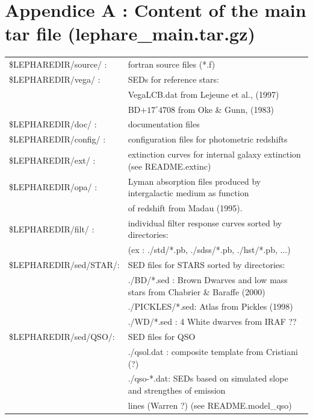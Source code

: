 \documentclass[12pt]{article}
\begin{document}
\section{Appendice A : Content of the main tar file (lephare\_main.tar.gz)}
%
\normalsize
\begin{tabular}{ll}
\$LEPHAREDIR/source/ :&  fortran source files (*.f) \\
%
\$LEPHAREDIR/vega/   :& SEDs for reference stars: \\
                    & VegaLCB.dat  from Lejeune et al., (1997) \\
                    & BD$+17^{\circ}4708$ from Oke \& Gunn, (1983) \\
%
\$LEPHAREDIR/doc/    :& documentation files \\
%
\$LEPHAREDIR/config/ :& configuration files for photometric redshifts  \\
%
\$LEPHAREDIR/ext/    :& extinction curves for internal galaxy extinction (see README.extinc)\\
%
\$LEPHAREDIR/opa/    :& Lyman absorption files produced by intergalactic medium as function \\
                    & of redshift from Madau (1995).  \\
%
\$LEPHAREDIR/filt/   :& individual filter response curves sorted by directories:  \\
		    &	       (ex : ./std/*.pb, ./sdss/*.pb, ./hst/*.pb, ...) \\
%
\$LEPHAREDIR/sed/STAR/:& SED files for STARS  sorted by directories: \\
		&	       ./BD/*.sed     : Brown Dwarves and low mass stars from Chabrier \& Baraffe (2000) \\
		&	       ./PICKLES/*.sed: Atlas from Pickles (1998) \\
		&	       ./WD/*.sed     : 4 White dwarves from IRAF ?? \\
%
\$LEPHAREDIR/sed/QSO/:& SED files for QSO  \\
		&	       ./qsol.dat : composite template from Cristiani (?) \\
		&	       ./qso-*.dat: SEDs based on simulated slope and strengthes of emission \\
		&	        lines (Warren ?) (see README.model\_qso)  \\

\end{tabular}
\end{document}
